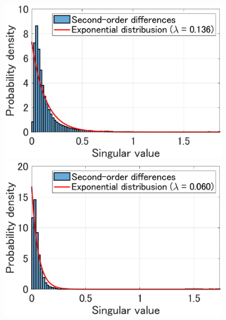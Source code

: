 \begin{figure}[t]
	\begin{center}
		\begin{minipage}{0.325\hsize}
			\centerline{\includegraphics[width=\hsize]{./fig_supplement/Dist_Anal/SV_Dist_JasperRidge.eps}}
		\end{minipage}
		\begin{minipage}{0.325\hsize}
			\centerline{\includegraphics[width=\hsize]{./fig_supplement/Dist_Anal/SV_Dist_PaviaU120.eps}}
		\end{minipage}
		\begin{minipage}{0.325\hsize}

\end{minipage}
\end{center}
\end{figure}
